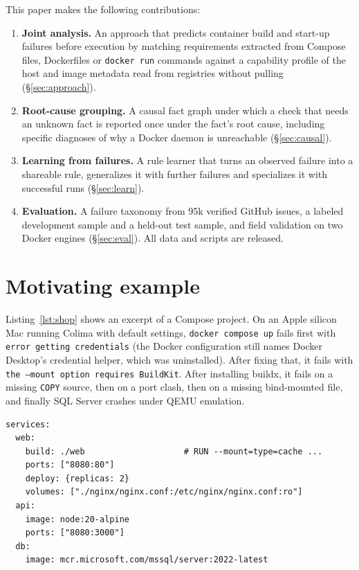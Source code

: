 \documentclass[preprint,12pt]{elsarticle}
\begin{document}
This paper makes the following contributions:
\begin{enumerate}
  \item \textbf{Joint analysis.} An approach that predicts container build and start-up failures before execution by matching requirements extracted from Compose files, Dockerfiles or \texttt{docker run} commands against a capability profile of the host and image metadata read from registries without pulling (\S\ref{sec:approach}).
  \item \textbf{Root-cause grouping.} A causal fact graph under which a check that needs an unknown fact is reported once under the fact's root cause, including specific diagnoses of why a Docker daemon is unreachable (\S\ref{sec:causal}).
  \item \textbf{Learning from failures.} A rule learner that turns an observed failure into a shareable rule, generalizes it with further failures and specializes it with successful runs (\S\ref{sec:learn}).
  \item \textbf{Evaluation.} A failure taxonomy from 95k verified GitHub issues, a labeled development sample and a held-out test sample, and field validation on two Docker engines (\S\ref{sec:eval}). All data and scripts are released.
\end{enumerate}

\section{Motivating example}
\label{sec:motivation}

Listing~\ref{lst:shop} shows an excerpt of a Compose project. On an Apple silicon Mac running Colima with default settings, \texttt{docker compose up} fails first with \texttt{error getting credentials} (the Docker configuration still names Docker Desktop's credential helper, which was uninstalled). After fixing that, it fails with \texttt{the --mount option requires BuildKit}. After installing buildx, it fails on a missing \texttt{COPY} source, then on a port clash, then on a missing bind-mounted file, and finally SQL Server crashes under QEMU emulation.

\begin{lstlisting}[caption={Excerpt of the example project.},label={lst:shop}]
services:
  web:
    build: ./web                    # RUN --mount=type=cache ...
    ports: ["8080:80"]
    deploy: {replicas: 2}
    volumes: ["./nginx/nginx.conf:/etc/nginx/nginx.conf:ro"]
  api:
    image: node:20-alpine
    ports: ["8080:3000"]
  db:
    image: mcr.microsoft.com/mssql/server:2022-latest
\end{lstlisting}
\end{document}
